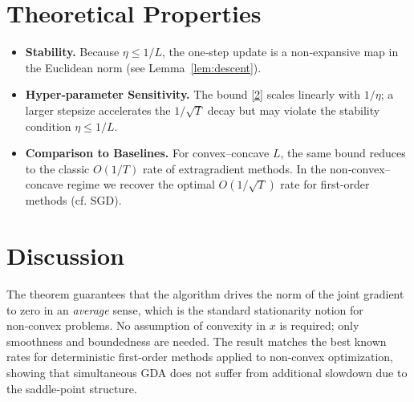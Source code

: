 \documentclass{article}
\begin{document}
\section*{Theoretical Properties}
\begin{itemize}
\item \textbf{Stability.} Because $\eta\le1/L$, the one‑step update is a non‑expansive map in the Euclidean norm (see Lemma~\ref{lem:descent}).
\item \textbf{Hyper‑parameter Sensitivity.} The bound \eqref{2} scales linearly with $1/\eta$; a larger stepsize accelerates the $1/\sqrt{T}$ decay but may violate the stability condition $ \eta\le1/L$.
\item \textbf{Comparison to Baselines.} For convex–concave $L$, the same bound reduces to the classic $O(1/T)$ rate of extragradient methods. In the non‑convex–concave regime we recover the optimal $O(1/\sqrt{T})$ rate for first‑order methods (cf. SGD).
\end{itemize}

\section*{Discussion}
The theorem guarantees that the algorithm drives the norm of the joint gradient to zero in an \emph{average} sense, which is the standard stationarity notion for non‑convex problems. No assumption of convexity in $x$ is required; only smoothness and boundedness are needed. The result matches the best known rates for deterministic first‑order methods applied to non‑convex optimization, showing that simultaneous GDA does not suffer from additional slowdown due to the saddle‑point structure.
\end{document}
